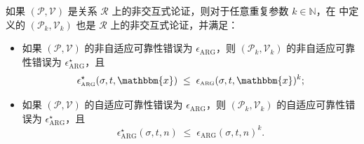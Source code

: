 \documentclass[american,singlepageview]{snargs-book-zh}
\newcommand{\Naturals}{\mathbb{N}}
\newcommand{\Relation}{\mathcal{R}}
\newcommand{\Instance}{\mathbbm{x}}
\newcommand{\InstanceSize}{n}
\newcommand{\ProtoProver}{P}
\newcommand{\ProtoVerifier}{V}
\newcommand{\ProtoSoundnessError}{\epsilon}
\newcommand{\ARGSubscript}{\scriptscriptstyle\mathrm{ARG}}
\newcommand{\ARGFormat}[1]{\mathcal{#1}}
\newcommand{\ARGProver}{\ARGFormat{\ProtoProver}}
\newcommand{\ARGVerifier}{\ARGFormat{\ProtoVerifier}}
\newcommand{\ARGNASoundnessError}{\ProtoSoundnessError_{\ARGSubscript}}
\newcommand{\ARGSoundnessError}{\ProtoSoundnessError_{\ARGSubscript}}
\newcommand{\ARGRepetitionParameter}{k}
\newcommand{\ROQueryBound}{t}
\newcommand{\ROOutputSize}{\sigma}
\begin{document}
\begin{lemma}
\label{lemma:narg-soundness-error-reduction}
如果 $(\ARGProver,\ARGVerifier)$ 是关系 $\Relation$ 上的非交互式论证，则对于任意重复参数 $\ARGRepetitionParameter \in \Naturals$，在 中定义的 $(\ARGProver_{\ARGRepetitionParameter},\ARGVerifier_{\ARGRepetitionParameter})$ 也是 $\Relation$ 上的非交互式论证，并满足：
\begin{itemize}[noitemsep]
  \item 如果 $(\ARGProver,\ARGVerifier)$ 的非自适应可靠性错误为 $\ARGNASoundnessError$，则 $(\ARGProver_{\ARGRepetitionParameter},\ARGVerifier_{\ARGRepetitionParameter})$ 的非自适应可靠性错误为 $\ARGNASoundnessError^{\star}$，且
    \[
      \ARGNASoundnessError^{\star}(\ROOutputSize,\ROQueryBound,\Instance)
      \;\le\;
      \ARGNASoundnessError(\ROOutputSize,\ROQueryBound,\Instance)^{\ARGRepetitionParameter};
    \]
  \item 如果 $(\ARGProver,\ARGVerifier)$ 的自适应可靠性错误为 $\ARGSoundnessError$，则 $(\ARGProver_{\ARGRepetitionParameter},\ARGVerifier_{\ARGRepetitionParameter})$ 的自适应可靠性错误为 $\ARGSoundnessError^{\star}$，且
    \[
      \ARGSoundnessError^{\star}(\ROOutputSize,\ROQueryBound,\InstanceSize)
      \;\le\;
      \ARGSoundnessError(\ROOutputSize,\ROQueryBound,\InstanceSize)^{\ARGRepetitionParameter}.
    \]
\end{itemize}
\end{lemma}
\end{document}

